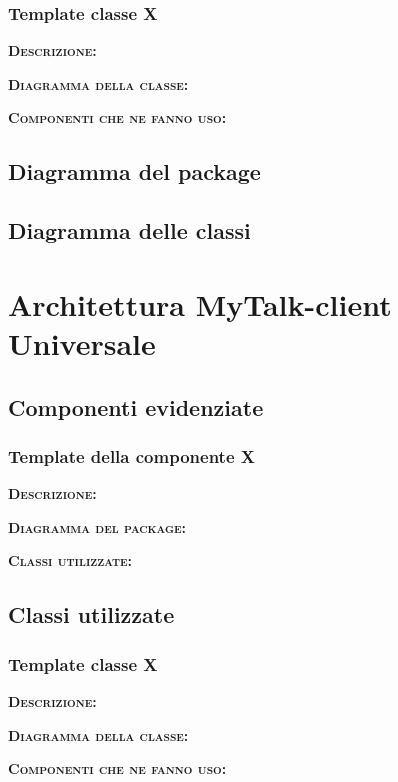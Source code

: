 \subsubsection{Template classe X}
\begin{description}
	\item{\scshape\bfseries Descrizione:} 
	\item{\scshape\bfseries Diagramma della classe:}
	\item{\scshape\bfseries Componenti che ne fanno uso:} 
\end{description}

\subsection{Diagramma del package}

\subsection{Diagramma delle classi}
\clearpage

\section{Architettura MyTalk-client Universale}

\subsection{Componenti evidenziate}

\subsubsection{Template della componente X}
\begin{description}
	\item{\scshape\bfseries Descrizione:} 
	\item{\scshape\bfseries Diagramma del package:}
	\item{\scshape\bfseries Classi utilizzate:} 
\end{description}

\subsection{Classi utilizzate}

\subsubsection{Template classe X}
\begin{description}
	\item{\scshape\bfseries Descrizione:} 
	\item{\scshape\bfseries Diagramma della classe:}
	\item{\scshape\bfseries Componenti che ne fanno uso:} 
\end{description}

